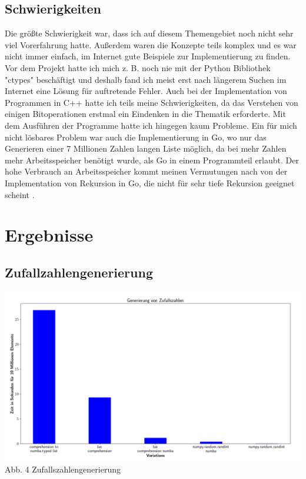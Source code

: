 \documentclass[11pt,a4paper]{article}
\begin{document}
\subsection{Schwierigkeiten}

Die größte Schwierigkeit war, dass ich auf diesem Themengebiet noch nicht sehr viel Vorerfahrung hatte.
Außerdem waren die Konzepte teils komplex und es war nicht immer einfach, im Internet gute Beispiele zur Implementierung
zu finden. Vor dem Projekt hatte ich mich z. B. noch nie mit der Python Bibliothek "ctypes" beschäftigt und deshalb fand
ich meist erst nach längerem Suchen im Internet eine Lösung für auftretende Fehler.
Auch bei der Implementation von Programmen in C++ hatte ich teils meine Schwierigkeiten, da das Verstehen
von einigen Bitoperationen erstmal ein Eindenken in die Thematik erforderte.
Mit dem Ausführen der Programme hatte ich hingegen kaum Probleme.
Ein für mich nicht lösbares Problem war auch die Implementierung in Go, wo nur das Generieren
einer 7 Millionen Zahlen langen Liste möglich, da bei mehr Zahlen mehr Arbeitsspeicher benötigt wurde,
als Go in einem Programmteil erlaubt. Der hohe Verbrauch an Arbeitsspeicher kommt meinen Vermutungen
nach von der Implementation von Rekursion in Go, die nicht für sehr tiefe Rekursion geeignet scheint
\cite{godeeprecursions} \cite{goroutinesize}.

\clearpage

\section{Ergebnisse}

\subsection{Zufallzahlengenerierung}

\begin{center}
    \hspace*{-1.5cm}\includegraphics[width=1.2\textwidth]{./diagramme/matplotlib/zufallszahlen.png}
    Abb. 4 Zufallszahlengenerierung
\end{center}
\end{document}
